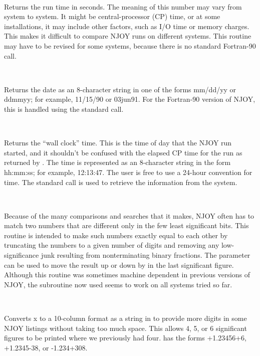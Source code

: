 \begin{description}
\begin{singlespace}
\item[\cword{timer(time)}] ~\par
Returns the run time in seconds.  The meaning of this number
may vary from system to system.  It might be central-processor
(CP) time, or at some installations, it may include other factors,
such as I/O time or memory charges.  This makes it difficult to
compare NJOY runs on different systems.  This routine may have
to be revised for some systems, because there is no standard
Fortran-90 call.

\item[\cword{dater(hdate)}] ~\par
Returns the date as an 8-character string in one of the forms
mm/dd/yy or ddmmyy; for example, 11/15/90 or 03jun91.  For the
Fortran-90 version of NJOY, this is handled using the standard
 call.

\item[\cword{wclock(htime)}] ~\par
Returns the ``wall clock'' time.  This is the time of day
that the NJOY run started, and it shouldn't be confused with
the elapsed CP time for the run as returned by .
The time is represented as an 8-character string in the form
hh:mm:ss; for example, 12:13:47.  The user is free to use a
24-hour convention for time.  The standard 
call is used to retrieve the information from the system.

\item[\cword{sigfig(x,ndig,idig)}] ~\par
Because of the many comparisons and searches that it makes, NJOY
often has to match two numbers that are different only in the few
least significant bits.  This routine is intended to make such
numbers exactly equal to each other by truncating the numbers to
a given number of digits and removing any low-significance junk
resulting from nonterminating binary fractions.  The 
parameter can be used to move the result up or down by 
in the last significant figure.  Although this routine was sometimes
machine dependent in previous versions of NJOY, the subroutine
now used seems to work on all systems tried so far.

\item[\cword{a10(x,hx)}] ~\par
Converts x to a 10-column format as a string in  to provide
more digits in some NJOY listings without taking too much space.
This allows 4, 5, or 6 significant figures to be printed where we
previously had four.   has the forms +1.23456+6, +1.2345-38,
or -1.234+308.
\end{singlespace}
\end{description}

